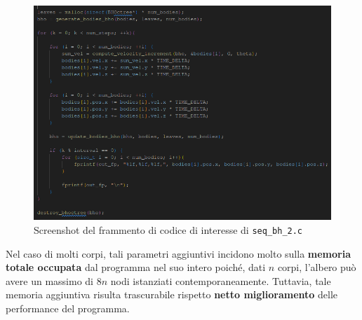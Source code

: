 \documentclass[12pt]{report}
\begin{document}
    \begin{figure}[H]
        \centering
        \includegraphics[width=\textwidth]{images/seq_bh_2.png}
        \caption{Screenshot del frammento di codice di interesse di \texttt{seq\_bh\_2.c}}
        \label{fig:seq_bh_2}
    \end{figure}

    Nel caso di molti corpi, tali parametri aggiuntivi incidono molto sulla \textbf{memoria totale occupata} dal programma nel suo intero poiché, dati $n$ corpi, l'albero può avere un massimo di $8n$ nodi istanziati contemporaneamente. Tuttavia, tale memoria aggiuntiva risulta trascurabile rispetto \textbf{netto miglioramento} delle performance del programma.

    \newpage
\end{document}
